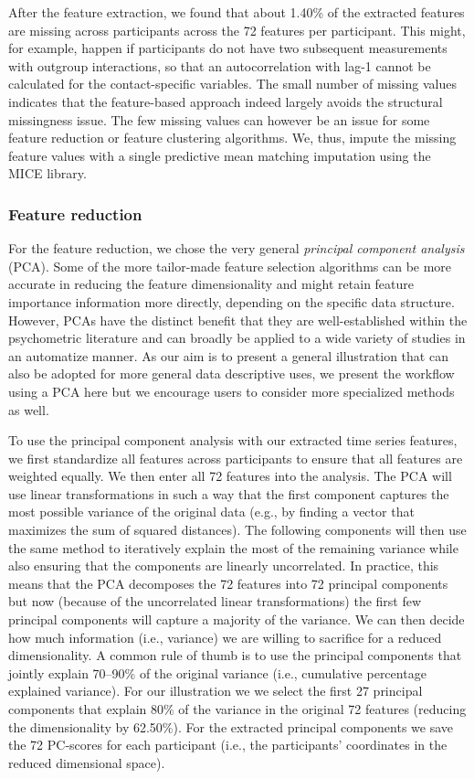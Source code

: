 After the feature extraction, we found that about 1.40\% of the
extracted features are missing across participants across the 72
features per participant. This might, for example, happen if
participants do not have two subsequent measurements with outgroup
interactions, so that an autocorrelation with lag-1 cannot be calculated
for the contact-specific variables. The small number of missing values
indicates that the feature-based approach indeed largely avoids the
structural missingness issue. The few missing values can however be an
issue for some feature reduction or feature clustering algorithms. We,
thus, impute the missing feature values with a single predictive mean
matching imputation using the MICE library.

\subsubsection{Feature reduction}

For the feature reduction, we chose the very general
\textit{principal component analysis} (PCA). Some of the more
tailor-made feature selection algorithms can be more accurate in
reducing the feature dimensionality and might retain feature importance
information more directly, depending on the specific data structure.
However, PCAs have the distinct benefit that they are well-established
within the psychometric literature and can broadly be applied to a wide
variety of studies in an automatize manner. As our aim is to present a
general illustration that can also be adopted for more general data
descriptive uses, we present the workflow using a PCA here but we
encourage users to consider more specialized methods as well.

To use the principal component analysis with our extracted time series
features, we first standardize all features across participants to
ensure that all features are weighted equally. We then enter all 72
features into the analysis. The PCA will use linear transformations in
such a way that the first component captures the most possible variance
of the original data (e.g., by finding a vector that maximizes the sum
of squared distances). The following components will then use the same
method to iteratively explain the most of the remaining variance while
also ensuring that the components are linearly uncorrelated. In
practice, this means that the PCA decomposes the 72 features into 72
principal components but now (because of the uncorrelated linear
transformations) the first few principal components will capture a
majority of the variance. We can then decide how much information (i.e.,
variance) we are willing to sacrifice for a reduced dimensionality. A
common rule of thumb is to use the principal components that jointly
explain 70--90\% of the original variance (i.e., cumulative percentage
explained variance). For our illustration we we select the first 27
principal components that explain 80\% of the variance in the original
72 features (reducing the dimensionality by 62.50\%). For the extracted
principal components we save the 72 PC-scores for each participant
(i.e., the participants' coordinates in the reduced dimensional space).


